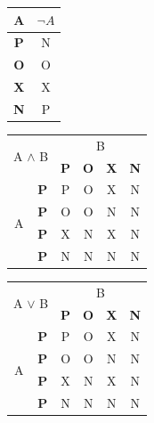 \documentclass[a4paper, 11pt]{article}
\begin{document}
\begin{table}[h!]
\label{tabulka2}
    \begin{center}
        \begin{tabular}{|c|c|}
            \hline
            A          & ${\neg{A}}$ \\
            \hline
            \textbf{P} & N        \\
            \hline
            \textbf{O} & O        \\
            \hline
            \textbf{X} & X        \\
            \hline
            \textbf{N} & P       \\
            \hline
        \end{tabular}
        \begin{tabular}{|c|c|c|c|c|c|}
            \hline
            \multicolumn{2}{|c|}{\multirow{2}{*}{A ${\wedge}$ B}} & \multicolumn{4}{c|}{B} \\ \cline{3-6} 
            \multicolumn{2}{|c|}{}  & \textbf{P}    &\textbf{O}   &\textbf{X}   &\textbf{N} \\ 
            \hline
            \multirow{4}{*}{A}  &\textbf{P}     & P    & O   & X   & N   \\ \cline{2-6} 
                                &\textbf{P}     & O    & O   & N   & N   \\ \cline{2-6} 
                                &\textbf{P}     & X    & N   & X   & N   \\ \cline{2-6} 
                                &\textbf{P}     & N    & N   & N   & N   \\ \hline
        \end{tabular}
        \begin{tabular}{|c|c|c|c|c|c|}
            \hline
            \multicolumn{2}{|c|}{\multirow{2}{*}{A ${\lor}$ B}} & \multicolumn{4}{c|}{B} \\ \cline{3-6} 
            \multicolumn{2}{|c|}{}  & \textbf{P}    &\textbf{O}   &\textbf{X}   &\textbf{N} \\ 
            \hline
            \multirow{4}{*}{A}  &\textbf{P}     & P    & O   & X   & N   \\ \cline{2-6} 
                                &\textbf{P}     & O    & O   & N   & N   \\ \cline{2-6} 
                                &\textbf{P}     & X    & N   & X   & N   \\ \cline{2-6} 
                                &\textbf{P}     & N    & N   & N   & N   \\ \hline

\end{tabular}
\end{center}
\end{table}
\end{document}
